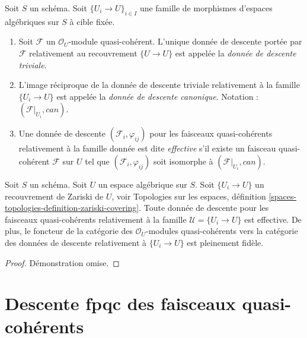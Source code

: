 \begin{definition}
\label{definition-descent-datum-effective-quasi-coherent}
Soit $S$ un schéma.
Soit $\{U_i \to U\}_{i \in I}$ une famille de morphismes d'espaces algébriques
sur $S$ à cible fixée.
\begin{enumerate}
\item Soit $\mathcal{F}$ un $\mathcal{O}_U$-module quasi-cohérent.
L'unique donnée de descente portée par $\mathcal{F}$ relativement au recouvrement
$\{U \to U\}$ est appelée la {\it donnée de descente triviale}.
\item L'image réciproque de la donnée de descente triviale relativement à
la famille $\{U_i \to U\}$ est appelée la {\it donnée de descente canonique}.
Notation : $(\mathcal{F}|_{U_i}, can)$.
\item Une donnée de descente $(\mathcal{F}_i, \varphi_{ij})$
pour les faisceaux quasi-cohérents relativement à la famille donnée
est dite {\it effective} s'il existe un faisceau quasi-cohérent
$\mathcal{F}$ sur $U$ tel que $(\mathcal{F}_i, \varphi_{ij})$
soit isomorphe à $(\mathcal{F}|_{U_i}, can)$.
\end{enumerate}
\end{definition}

\begin{lemma}
\label{lemma-zariski-descent-effective}
Soit $S$ un schéma. Soit $U$ un espace algébrique sur $S$.
Soit $\{U_i \to U\}$ un recouvrement de Zariski de $U$, voir
Topologies sur les espaces,
définition \ref{spaces-topologies-definition-zariski-covering}.
Toute donnée de descente pour les faisceaux quasi-cohérents
relativement à la famille $\mathcal{U} = \{U_i \to U\}$ est
effective. De plus, le foncteur de la catégorie des
$\mathcal{O}_U$-modules quasi-cohérents vers la catégorie
des données de descente relativement à $\{U_i \to U\}$ est pleinement fidèle.
\end{lemma}

\begin{proof}
Démonstration omise.
\end{proof}












\section{Descente fpqc des faisceaux quasi-cohérents}
\label{section-fpqc-descent-quasi-coherent}

